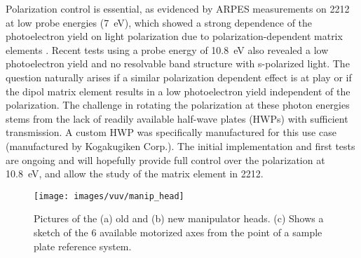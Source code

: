 Polarization control is essential, as evidenced by ARPES measurements on 2212 at low probe energies (\qty{7}{\electronvolt}), which showed a strong dependence of the photoelectron yield on light polarization due to polarization-dependent matrix elements \cite{fanciulli_spin_2018}.
Recent tests using a probe energy of \qty{10.8}{\electronvolt} also revealed a low photoelectron yield and no resolvable band structure with s-polarized light.
The question naturally arises if a similar polarization dependent effect is at play or if the dipol matrix element results in a low photoelectron yield independent of the polarization.
The challenge in rotating the polarization at these photon energies stems from the lack of readily available half-wave plates (HWPs) with sufficient transmission.
A custom HWP was specifically manufactured for this use case (manufactured by Kogakugiken Corp.).
The initial implementation and first tests are ongoing and will hopefully provide full control over the polarization at \qty{10.8}{\electronvolt}, and allow the study of the matrix element in 2212.

\begin{figure}[t]
	\centering
	\texttt{[image: images/vuv/manip\_head]}
	\caption{Pictures of the (a) old and (b) new manipulator heads. (c) Shows a sketch of the 6 available motorized axes from the point of a sample plate reference system.}
	\label{fig:manip_head}
\end{figure}

